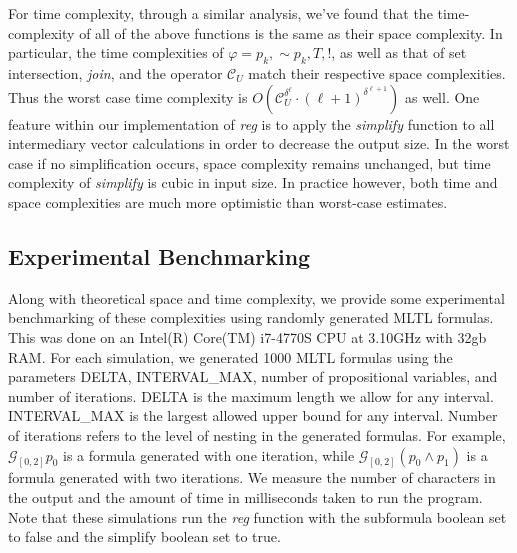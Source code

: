 \documentclass[runningheads]{llncs}
\renewcommand{\phi}{\varphi}
\begin{document}
For time complexity, through a similar analysis, we've found that the time-complexity of all of the above functions is the same as their space complexity. In particular, the time complexities of $\phi = p_k, \scriptstyle{\sim}\textstyle p_k, T, !$, as well as that of set intersection, \textit{join}, and the operator $\mathcal{C}_U$ match their respective space complexities. Thus the worst case time complexity is $O(\mathcal{C}_U^{\delta ^ \ell} \cdot (\ell + 1)^{\delta^{\ell + 1}})$ as well. 
One feature within our implementation of \textit{reg} is to apply the \textit{simplify} function to all intermediary vector calculations in order to decrease the output size. In the worst case if no simplification occurs, space complexity remains unchanged, but time complexity of \textit{simplify} is cubic in input size. In practice however, both time and space complexities are much more optimistic than worst-case estimates. 
 
\subsection{Experimental Benchmarking}
 Along with theoretical space and time complexity, we provide some experimental benchmarking of these complexities using randomly generated MLTL formulas.
This was done on an Intel(R) Core(TM) i7-4770S CPU at 3.10GHz with 32gb RAM.
For each simulation, we generated 1000 MLTL formulas using the parameters DELTA, INTERVAL\_MAX, number of propositional variables, and number of iterations. DELTA is the maximum length we allow for any interval. INTERVAL\_MAX is the largest allowed upper bound for any interval. Number of iterations refers to the level of nesting in the generated formulas. For example, $\mathcal{G}_{[0,2]}p_0$ is a formula generated with one iteration, while $\mathcal{G}_{[0,2]}(p_0 \land p_1)$ is a formula generated with two iterations. We measure the number of characters in the output and the amount of time in milliseconds taken to run the program. Note that these simulations run the \textit{reg} function with the subformula boolean set to false and the simplify boolean set to true.
\end{document}
